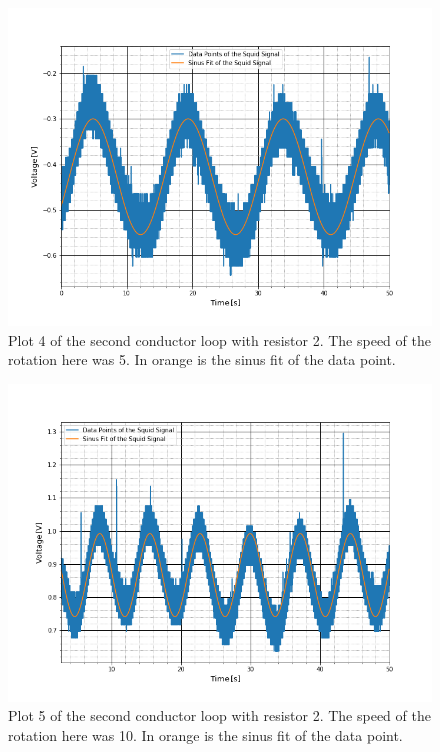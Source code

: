 \begin{figure}[ht]
	\includegraphics[scale=0.5]{Bild/r2_5_4}
	\centering
	\caption[Plot of second conductor loop 4]{Plot 4 of the second conductor loop with resistor 2. The speed of the rotation here was 5. In orange is the sinus fit of the data point.}
\end{figure}
\begin{figure}[ht]
	\includegraphics[scale=0.5]{Bild/r2_10_1}
	\centering
	\caption[Plot of second conductor loop 5]{Plot 5 of the second conductor loop with resistor 2. The speed of the rotation here was 10. In orange is the sinus fit of the data point.}
\end{figure}

